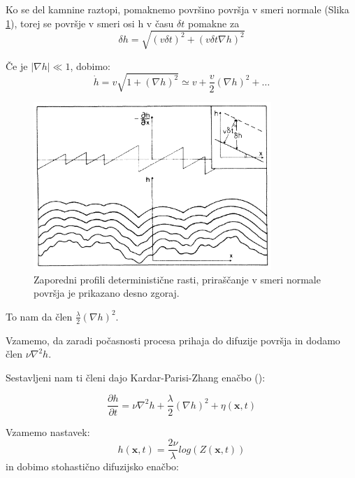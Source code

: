 \documentclass[a4paper, twoside, 12pt]{book}
\begin{document}
    Ko se del kamnine raztopi, pomaknemo površino površja v smeri normale (Slika \ref{fig:kpz}), torej se površje v smeri osi h v času $\delta t$ pomakne za 
    \begin{equation}
      \delta h = \sqrt{ (v \delta t)^2 + (v \delta t \nabla h)^2}
    \end{equation}

    Če je $|\nabla h| \ll 1$, dobimo: 
    \begin{equation}
      \dot h = v \sqrt{1 + (\nabla h)^2} \simeq v + \frac{v}{2} (\nabla h)^2 + \ldots
    \end{equation}

    \begin{figure}[h]
      \begin{center}
        \includegraphics[width=9cm]{slike/kpz}
      \end{center}
      \caption{Zaporedni profili deterministične rasti, priraščanje v smeri normale površja je prikazano desno zgoraj.}
      \label{fig:kpz}
    \end{figure}

    To nam da člen $\frac{\lambda}{2} (\nabla h)^2$.

    Vzamemo, da zaradi počasnosti procesa prihaja do difuzije površja in dodamo člen $\nu \nabla^2 h$.

    Sestavljeni nam ti členi dajo Kardar-Parisi-Zhang enačbo (\cite{kardar1986dynamic}):

    \begin{equation}
      \frac{\partial h}{\partial t} = \nu \nabla^2 h + \frac{\lambda}{2} (\nabla h)^2 + \eta (\mathbf{x},t)
      \label{KPZ}
    \end{equation}

    Vzamemo nastavek:
    \begin{equation}
      h(\mathbf{x},t) = \frac{2 \nu}{\lambda} log(Z(\mathbf{x},t))
    \end{equation}
    in dobimo stohastično difuzijsko enačbo:
\end{document}
